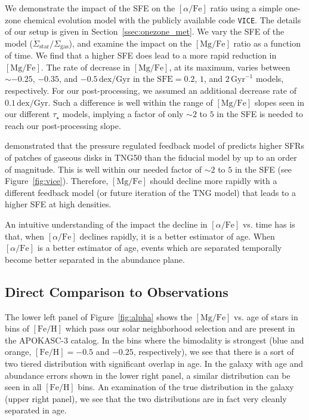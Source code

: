 \documentclass[twocolumn]{aastex631}
\newcommand{\Gyr}{\ensuremath{\textrm{Gyr}}}
\newcommand{\FeH}{\ensuremath{[\textrm{Fe}/\textrm{H}]}}
\newcommand{\MgFe}{\ensuremath{[\textrm{Mg}/\textrm{Fe}]}}
\newcommand{\alphaFe}{\ensuremath{[\alpha/\textrm{Fe}]}}
\newcommand{\dex}{\ensuremath{\textrm{dex}}}
\begin{document}
We demonstrate the impact of the SFE on the \alphaFe{} ratio using a simple one-zone chemical evolution model with the publicly available code \texttt{VICE}. The details of our setup is given in Section~\ref{ssec:onezone_met}. We vary the SFE of the model ($\dot{\Sigma}_{\textrm{star}}/\Sigma_{\textrm{gas}}$), and examine the impact on the \MgFe{} ratio as a function of time. We find that a higher SFE does lead to a more rapid reduction in \MgFe{}. The rate of decrease in \MgFe{}, at its maximum, varies between $\sim-0.25$, $-0.35$, and $-0.5\,\dex/\Gyr$ in the $\textrm{SFE}=0.2$, $1$, and $2\,\Gyr^{-1}$ models, respectively. For our post-processing, we assumed an additional decrease rate of $0.1\,\dex/\Gyr$. Such a difference is well within the range of \MgFe{} slopes seen in our different $\tau_{\star}$ models, implying a factor of only $\sim2$ to $5$ in the SFE is needed to reach our post-processing slope.

\citet{2024arXiv240909121H} demonstrated that the pressure regulated feedback model of \citet{2022ApJ...936..137O} predicts higher SFRs of patches of gaseous disks in TNG50 than the fiducial model by up to an order of magnitude. This is well within our needed factor of $\sim2$ to $5$ in the SFE (see Figure~\ref{fig:vice}). Therefore, \MgFe{} should decline more rapidly with a different feedback model (or future iteration of the TNG model) that leads to a higher SFE at high densities.

An intuitive understanding of the impact the decline in \alphaFe{} vs. time has is that, when \alphaFe{} declines rapidly, it is a better estimator of age. When \alphaFe{} is a better estimator of age, events which are separated temporally become better separated in the abundance plane.

\subsection{Direct Comparison to Observations}\label{ssec:compare_obs}
The lower left panel of Figure~\ref{fig:alpha} shows the \MgFe{} vs. age of stars in bins of \FeH{} which pass our solar neighborhood selection and are present in the APOKASC-3 catalog. In the bins where the bimodality is strongest (blue and orange, $\FeH=-0.5$ and $-0.25$, respectively), we see that there is a sort of two tiered distribution with significant overlap in age. In the galaxy with age and abundance errors shown in the lower right panel, a similar distribution can be seen in all \FeH{} bins. An examination of the true distribution in the galaxy (upper right panel), we see that the two distributions are in fact very cleanly separated in age.
\end{document}
